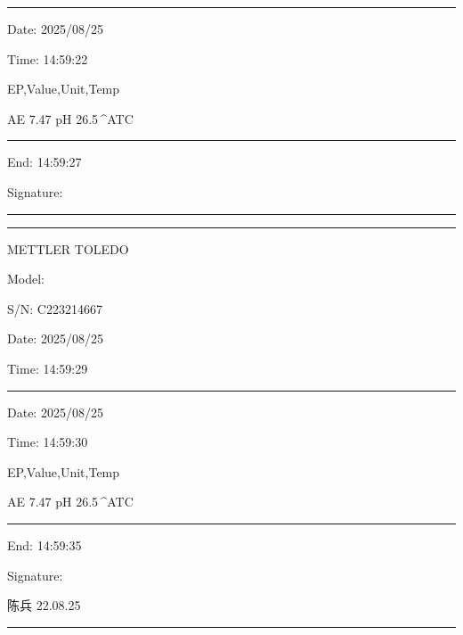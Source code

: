 \documentclass[UTF8,10pt,a4paper,fontset=fandol]{ctexart}
\newcommand{\fieldvalue}[1]{#1}
\newcommand{\handwritten}[1]{#1}
\begin{document}
\begin{flushleft}
\noindent\rule{0.48\linewidth}{0.4pt}

\noindent Date:
\fieldvalue{2025/08/25}

\noindent Time:
\fieldvalue{14:59:22}

\noindent EP,Value,Unit,Temp

\noindent
\fieldvalue{AE}\quad
\fieldvalue{7.47}\quad
\fieldvalue{pH}\quad
\fieldvalue{26.5\,^{\circ}}\quad ATC

\vspace{1.5em}
\noindent\rule{0.48\linewidth}{0.4pt}

\noindent End:
\fieldvalue{14:59:27}

\noindent Signature:

\noindent\rule{0.48\linewidth}{0.4pt}

\vspace{1.5em}
\noindent\rule{0.48\linewidth}{0.4pt}

\noindent METTLER TOLEDO

\noindent Model:

\noindent S/N:
\fieldvalue{C223214667}

\noindent Date:
\fieldvalue{2025/08/25}

\noindent Time:
\fieldvalue{14:59:29}

\noindent\rule{0.48\linewidth}{0.4pt}

\noindent Date:
\fieldvalue{2025/08/25}

\noindent Time:
\fieldvalue{14:59:30}

\noindent EP,Value,Unit,Temp

\noindent
\fieldvalue{AE}\quad
\fieldvalue{7.47}\quad
\fieldvalue{pH}\quad
\fieldvalue{26.5\,^{\circ}}\quad ATC

\vspace{1.5em}
\noindent\rule{0.48\linewidth}{0.4pt}

\noindent End:
\fieldvalue{14:59:35}

\noindent Signature:

\fieldvalue{\handwritten{陈兵 22.08.25}}

\noindent\rule{0.48\linewidth}{0.4pt}

\end{flushleft}
\end{document}
